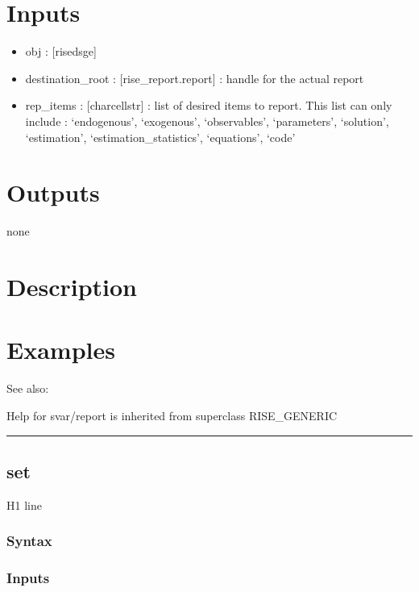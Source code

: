 \documentclass[letterpaper,10pt,english]{sphinxmanual}
\begin{document}
\section{Inputs}
\label{classes/models/@svar/svar:id97}\begin{itemize}
\item {} 
obj : {[}rise\textbar{}dsge{]}

\item {} 
destination\_root : {[}rise\_report.report{]} : handle for the actual report

\item {} 
rep\_items : {[}char\textbar{}cellstr{]} : list of desired items to report. This list
can only include : `endogenous', `exogenous', `observables',
`parameters', `solution', `estimation', `estimation\_statistics',
`equations', `code'

\end{itemize}


\section{Outputs}
\label{classes/models/@svar/svar:id98}
none


\section{Description}
\label{classes/models/@svar/svar:id99}

\section{Examples}
\label{classes/models/@svar/svar:id100}
See also:

Help for svar/report is inherited from superclass RISE\_GENERIC


\bigskip\hrule{}\bigskip



\subsection{set}
\label{classes/models/@svar/svar:id101}\label{classes/models/@svar/svar:set}
H1 line


\subsubsection{Syntax}
\label{classes/models/@svar/svar:id102}

\subsubsection{Inputs}
\label{classes/models/@svar/svar:id103}
\end{document}
